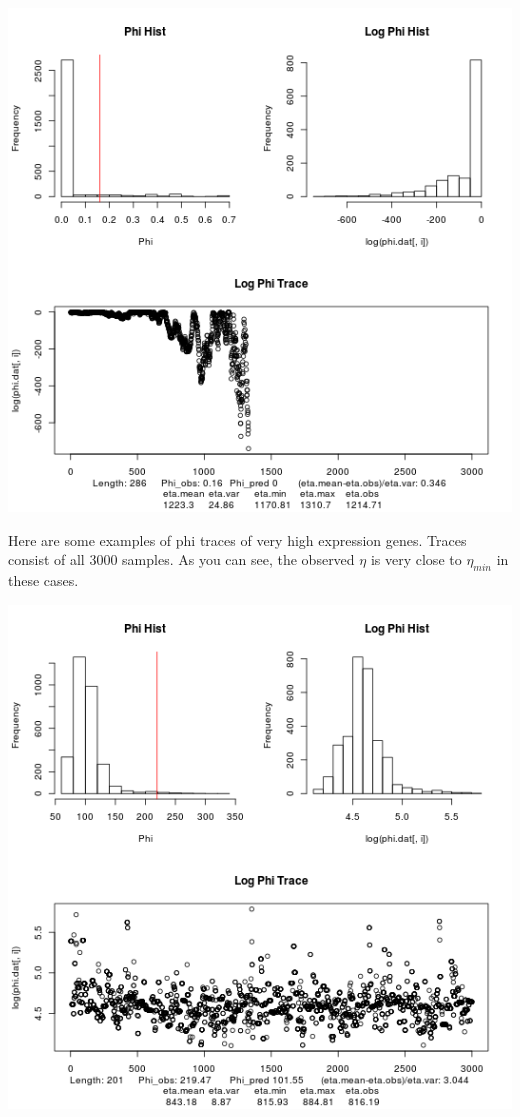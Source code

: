 \documentclass{article}
\begin{document}
 	\includegraphics[scale=0.5]{../chosen_100/3000_steps/BIS10/lnorm_prop/hist/83_phi_hist.png}
 	
 	\pagebreak
 	Here are some examples of phi traces of very high expression genes. Traces consist of all 3000 samples. As you can see, the observed $\eta$ is very close to $\eta_{min}$ in these cases.
 	
 	\includegraphics[scale=0.5]{../chosen_100/3000_steps/BIS10/lnorm_prop/hist/100_phi_hist.png}
 	
\end{document}
